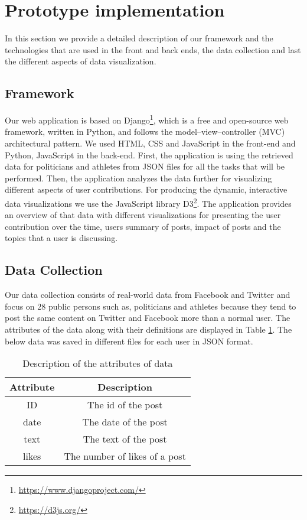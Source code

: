 \section{Prototype implementation}

In this section we provide a detailed description of our framework and the technologies that are used in the front and back ends, the data collection and last the different aspects of data visualization.


\subsection{Framework}

Our web application is based on Django\footnote{\url{https://www.djangoproject.com/}}, which is a free and open-source web framework, written in Python, and follows the model–view–controller (MVC) architectural pattern. We used HTML, CSS and JavaScript in the front-end and Python, JavaScript in the back-end. First, the application is using the retrieved data for politicians and athletes from JSON files for all the tasks that will be performed. Then, the application analyzes the data further for visualizing different aspects of user contributions. For producing the dynamic, interactive data visualizations we use the JavaScript library D3\footnote{\url{https://d3js.org/}}.
The application provides an overview of that data with different visualizations for presenting the user contribution over the time, users summary of posts, impact of posts and the topics that a user is discussing.


\subsection{Data Collection}

Our data collection consists of real-world data from Facebook 
and Twitter and focus on 28 public persons such as, politicians 
and athletes because they tend to post the same content on Twitter and Facebook more than a normal user. The attributes of the data along with their definitions are displayed in Table \ref{table:attrib_des}. The below data was saved in different files for each user in JSON format.

\begin{table}[ht] 
\caption{Description of the attributes of data} 
\centering  
\begin{tabular}{c | c} 
\hline\hline 
Attribute & Description \\ [0.5ex] 
\hline 
ID & The id of the post \\ 
date & The date of the post \\ 
text & The text of the post\\ 
likes & The number of likes of a post \\ [1ex]  
\hline  
\end{tabular} 
\label{table:attrib_des}
\end{table}

